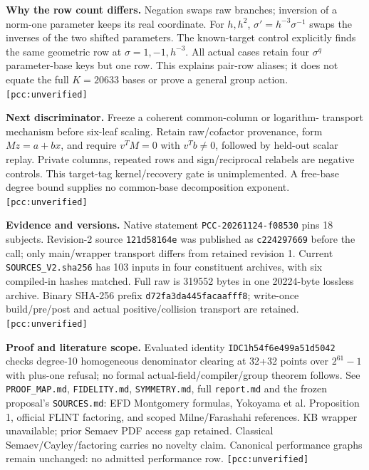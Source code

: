 \documentclass[10pt]{article}
\begin{document}
\textbf{Why the row count differs.} Negation swaps raw branches; inversion of
a norm-one parameter keeps its real coordinate. For $h,h^2$,
$\sigma'=h^{-3}\sigma^{-1}$ swaps the inverses of the two shifted parameters.
The known-target control explicitly finds the same geometric row at
$\sigma=1,-1,h^{-3}$. All actual cases retain four $\sigma^q$ parameter-base
keys but one row. This explains pair-row aliases; it does not equate the full
$K=20633$ bases or prove a general group action. \texttt{[pcc:unverified]}

\textbf{Next discriminator.} Freeze a coherent common-column or logarithm-
transport mechanism before six-leaf scaling. Retain raw/cofactor provenance,
form $Mz=a+bx$, and require $v^TM=0$ with $v^Tb\ne0$, followed by held-out scalar
replay. Private columns, repeated rows and sign/reciprocal relabels are negative
controls. This target-tag kernel/recovery gate is unimplemented. A free-base
degree bound supplies no common-base decomposition exponent. \texttt{[pcc:unverified]}

\textbf{Evidence and versions.} Native statement
\texttt{PCC-20261124-f08530} pins 18 subjects. Revision-2 source
\texttt{121d58164e} was published as \texttt{c224297669} before the call;
only main/wrapper transport differs from retained revision 1. Current
\texttt{SOURCES\_V2.sha256} has 103 inputs in four constituent archives,
with six compiled-in hashes matched. Full raw is 319552 bytes in one 20224-byte
lossless archive. Binary SHA-256 prefix \texttt{d72fa3da445facaafff8}; write-once
build/pre/post and actual positive/collision transport are retained. \texttt{[pcc:unverified]}

\textbf{Proof and literature scope.} Evaluated identity
\texttt{IDC1h54f6e499a51d5042} checks degree-10 homogeneous denominator
clearing at 32+32 points over $2^{61}-1$ with plus-one refusal; no formal
actual-field/compiler/group theorem follows. See \texttt{PROOF\_MAP.md},
\texttt{FIDELITY.md}, \texttt{SYMMETRY.md}, full \texttt{report.md} and
the frozen proposal's \texttt{SOURCES.md}: EFD Montgomery formulas,
Yokoyama et al. Proposition 1, official FLINT factoring, and scoped
Milne/Farashahi references. KB wrapper unavailable; prior Semaev PDF access
gap retained. Classical Semaev/Cayley/factoring carries no novelty claim.
Canonical performance graphs remain unchanged: no admitted performance row. \texttt{[pcc:unverified]}
\end{document}
